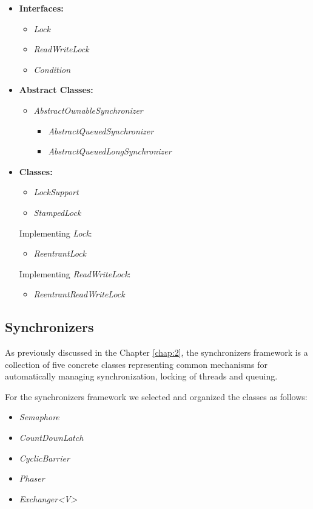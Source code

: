 \documentclass[]{usiinfthesis}
\begin{document}
\begin{itemize}
    \item \textbf{Interfaces:}
    \begin{itemize}
        \item \textit{Lock}
        \item \textit{ReadWriteLock}
        \item \textit{Condition}
    \end{itemize}
    \item \textbf{Abstract Classes:}
    \begin{itemize}
        \item \textit{AbstractOwnableSynchronizer}
        \begin{itemize}
            \item \textit{AbstractQueuedSynchronizer}
            \item \textit{AbstractQueuedLongSynchronizer}
        \end{itemize}
    \end{itemize}
    \item \textbf{Classes:}
    \begin{itemize}    
        \item \textit{LockSupport}
        \item \textit{StampedLock}
    \end{itemize}
    Implementing \textit{Lock}:
    \begin{itemize}
        \item \textit{ReentrantLock}
    \end{itemize}
    Implementing \textit{ReadWriteLock}:
    \begin{itemize}
        \item \textit{ReentrantReadWriteLock}
    \end{itemize}
\end{itemize}

\subsection{Synchronizers}
As previously discussed in the Chapter \ref{chap:2}, the synchronizers framework is a collection of five concrete classes representing common mechanisms for automatically managing synchronization, locking of threads and queuing.

\noindent
For the synchronizers framework we selected and organized the classes as follows:

\begin{itemize}
    \item \textit{Semaphore}
    \item \textit{CountDownLatch}
    \item \textit{CyclicBarrier}
    \item \textit{Phaser}
    \item \textit{Exchanger<V>}
\end{itemize}
\end{document}
